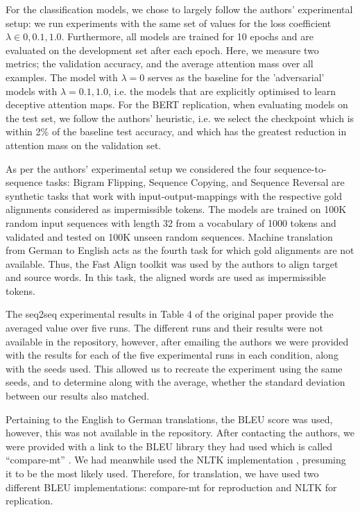 For the classification models, we chose to largely follow the authors' experimental setup: we run experiments with the same set of values for the loss coefficient $\lambda \in {0, 0.1, 1.0}$. Furthermore, all models are trained for 10 epochs and are evaluated on the development set after each epoch. Here, we measure two metrics; the validation accuracy, and the average attention mass over all examples. The model with $\lambda = 0$ serves as the baseline for the 'adversarial' models with $\lambda = 0.1, 1.0$, i.e. the models that are explicitly optimised to learn deceptive attention maps. For the BERT replication, when evaluating models on the test set, we follow the authors' heuristic, i.e. we select the checkpoint which is within 2\% of the baseline test accuracy, and which has the greatest reduction in attention mass on the validation set.

As per the authors' experimental setup we considered the four sequence-to-sequence tasks:  Bigram Flipping, Sequence Copying, and Sequence Reversal are synthetic tasks that work with input-output-mappings with the respective gold alignments considered as impermissible tokens. The models are trained on 100K random input sequences with length 32 from a vocabulary of 1000 tokens and validated and tested on 100K unseen random sequences. Machine translation from German to English acts as the fourth task for which gold alignments are not available. Thus, the Fast Align toolkit \citep{dyer-etal-2013-simple} was used by the authors to align target and source words. In this task, the aligned words are used as impermissible tokens.

The seq2seq experimental results in Table 4 of the original paper provide the averaged value over five runs. The different runs and their results were not available in the repository, however, after emailing the authors we were provided with the results for each of the five experimental runs in each condition, along with the seeds used. This allowed us to recreate the experiment using the same seeds, and to determine along with the average, whether the standard deviation between our results also matched.

Pertaining to the English to German translations, the BLEU score was used, however, this was not available in the repository. After contacting the authors, we were provided with a link to the BLEU library they had used which is called ``compare-mt'' \citep{neubig-etal-2019-compare}. We had meanwhile used the NLTK implementation \citep{BirdKleinLoper09}, presuming it to be the most likely used. Therefore, for translation, we have used two different BLEU implementations: compare-mt for reproduction and NLTK for replication.


